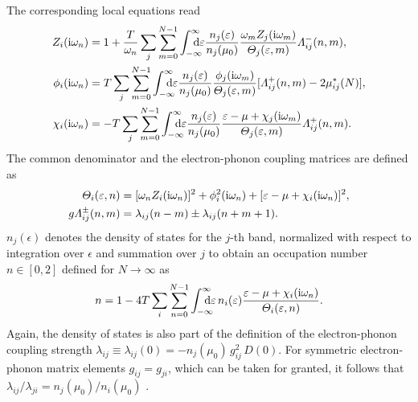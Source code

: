 The corresponding local  equations read
%
\begin{subequations} \label{local multi-band Eliashberg equations}
    \begin{align}
        Z_i(\I \omega_n) &= 1 + \frac T {\omega_n} \sum_j \sum_{m = 0}^{N - 1}
        \int \from{-\infty} \till \infty \D \epsilon
        \frac{n_j(\epsilon)}{n_j(\mu_0)}
        \frac{\omega_m Z_j(\I \omega_m)}{\Theta_j(\epsilon, m)}
        \Lambda_{i j}^-(n, m),
        \\
        \phi_i(\I \omega_n) &= T \sum_j \sum_{m = 0}^{N - 1}
        \int \from{-\infty} \till \infty \D \epsilon
        \frac{n_j(\epsilon)}{n_j(\mu_0)}
        \frac{\phi_j(\I \omega_m)}{\Theta_j(\epsilon, m)}
        [\Lambda_{i j}^+(n, m) - 2 \mu^*_{i j}(N)],
        \\
        \chi_i(\I \omega_n) &= -T \sum_j \sum_{m = 0}^{N - 1}
        \int \from{-\infty} \till \infty \D \epsilon
        \frac{n_j(\epsilon)}{n_j(\mu_0)}
        \frac{\epsilon - \mu + \chi_j(\I \omega_m)}{\Theta_j(\epsilon, m)}
        \Lambda_{i j}^+(n, m).
    \end{align}
\end{subequations}
%
The common denominator and the electron-phonon coupling matrices are defined as
%
\begin{align*}
    \varTheta_i(\varepsilon, n) &= [\omega_n Z_i(\mathrm i \omega_n)]^2
    + \phi_i^2(\mathrm i \omega_n) + [\varepsilon - \mu + \chi_i(\mathrm i \omega_n)]^2,
    \\g
    \varLambda_{i j}^\pm(n, m)
    &= \lambda_{i j}(n - m) \pm \lambda_{i j}(n + m + 1).
\end{align*}
%
$n_j(\epsilon)$ denotes the density of states for the $j$-th band, normalized
with respect to integration over $\epsilon$ and summation over $j$ to obtain
an occupation number $n \in [0, 2]$ defined for $N \rightarrow \infty$ as
%
\begin{equation*}
    n = 1 - 4 T \sum_i \sum_{n = 0}^{N - 1}
    \int \from{-\infty} \till \infty \D \epsilon \, n_i(\epsilon)
    \frac{\epsilon - \mu + \chi_i(\I \omega_n)}{\Theta_i(\epsilon, n)}.
\end{equation*}
%
Again, the density of states is also part of the definition of the
electron-phonon coupling strength $\lambda_{i j} \equiv \lambda_{i j}(0) =
-n_j(\mu_0) \, g_{i j}^2 \, D(0)$. For symmetric electron-phonon matrix elements
$g_{i j} = g_{j i}$, which can be taken for granted, it follows that $\lambda_{i
j} / \lambda_{j i} = n_j(\mu_0) / n_i(\mu_0)$ \cite[Eq.~3.64]{Galasso05}.

